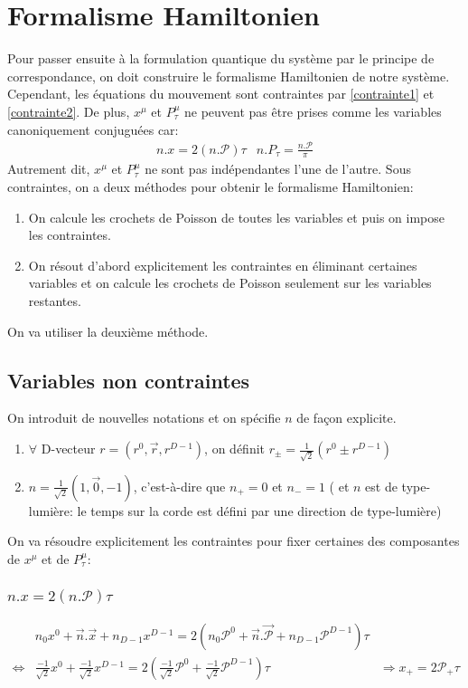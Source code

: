 \documentclass[a4paper,12pt]{article}
\def\xmu{x^\mu}
\def\pt{P_\tau}
\begin{document}
\section{Formalisme Hamiltonien}
Pour passer ensuite à la formulation quantique du système par le principe de correspondance, on doit construire le formalisme Hamiltonien de notre système. Cependant, les équations du mouvement sont contraintes par \eqref{contrainte1} et \eqref{contrainte2}.
De plus, $\xmu$ et $P_\tau^\mu$ ne peuvent pas être prises comme les variables canoniquement conjuguées car:
\begin{align*}
& n.x=2(n.\mathcal{P})\tau & n.P_\tau=\frac{n.\mathcal{P}}{\pi}&
\end{align*}
Autrement dit, $\xmu$ et $\pt^\mu$ ne sont pas indépendantes l'une de l'autre. Sous contraintes, on a deux méthodes pour obtenir le formalisme Hamiltonien:
\begin{enumerate}
\item On calcule les crochets de Poisson de toutes les variables et puis on impose les contraintes.
\item On résout d'abord explicitement les contraintes en éliminant certaines variables et on calcule les crochets de Poisson seulement sur les variables restantes.
\end{enumerate} 
On va utiliser la deuxième méthode.
\subsection{Variables non contraintes}
On introduit de nouvelles notations et on spécifie $n$ de façon explicite.
\begin{enumerate}
\item $\forall$ D-vecteur $r=(r^0,\vec{r},r^{D-1})$, on définit
$r_\pm=\frac{1}{\sqrt2}(r^0\pm r^{D-1})$
\item $n=\frac{1}{\sqrt2}(1,\vec{0},-1)$, c'est-à-dire que 
$n_+=0$ et $n_-=1$ ( et $n$ est de type-lumière: le temps sur la corde est défini par une direction de type-lumière)
\end{enumerate}
On va résoudre explicitement les contraintes pour fixer certaines des composantes de $\xmu$ et de $P_\tau^\mu$: 
\subsubsection{$n.x=2(n.\mathcal{P})\tau$}\label{point1}
\begin{align*}
& n_0x^0 + \vec{n}.\vec{x} + n_{D-1}x^{D-1}=2\left( n_0\mathcal{P}^0 + \vec{n}.\vec{\mathcal{P}} + n_{D-1}\mathcal{P}^{D-1}\right) \tau\\
\Leftrightarrow &\frac{-1}{\sqrt{2}}x^0 + \frac{-1}{\sqrt{2}}x^{D-1}=2\left( \frac{-1}{\sqrt{2}}\mathcal{P}^0  + \frac{-1}{\sqrt{2}}\mathcal{P}^{D-1}\right) \tau &\Rightarrow\boxed{x_+ = 2 \mathcal{P_+}\tau}
\end{align*}
\end{document}
